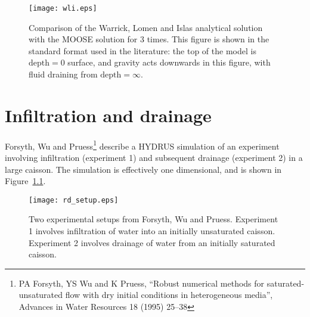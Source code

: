 \documentclass[]{scrreprt}
\begin{document}
\begin{figure}[htb]
\centering
\texttt{[image: wli.eps]}
\caption{Comparison of the Warrick, Lomen and Islas analytical solution
  with the MOOSE solution for 3 times.  This figure is shown in the
  standard format used in the literature: the top of the model is
  $\mbox{depth}=0$ surface, and gravity acts downwards in this figure,
with fluid draining from $\mbox{depth}=\infty$.}
\label{wli.fig}
\end{figure}




\chapter{Infiltration and drainage}
\label{forsyth}

Forsyth, Wu and Pruess\footnote{PA Forsyth, YS Wu and K Pruess,
  ``Robust numerical methods for saturated-unsaturated flow with dry
  initial conditions in heterogeneous media'', Advances in Water
  Resources 18 (1995) 25--38} describe a HYDRUS simulation of an
experiment involving infiltration (experiment 1) and subsequent
drainage (experiment 2) in a large caisson.  The simulation is
effectively one dimensional, and is shown in
Figure~\ref{rd_setup.fig}.

\begin{figure}[htb]
\begin{center}
\texttt{[image: rd\_setup.eps]}
\caption{Two experimental setups from Forsyth, Wu and Pruess.
  Experiment 1 involves infiltration of water into an initially
  unsaturated caisson.  Experiment 2 involves drainage of water from
  an initially saturated caisson.}
\label{rd_setup.fig}
\end{center}
\end{figure}
\end{document}
